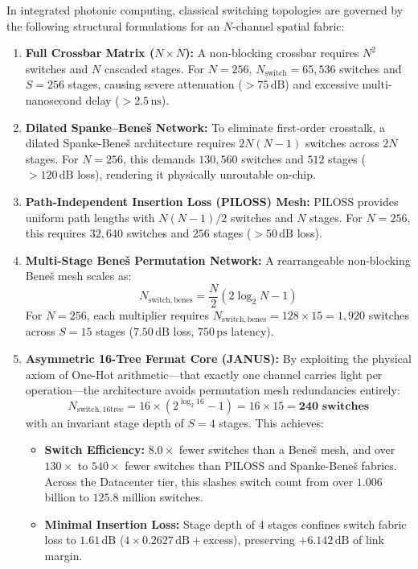 \documentclass[journal]{IEEEtran}
\begin{document}
In integrated photonic computing, classical switching topologies are governed by the following structural formulations for an $N$-channel spatial fabric:
\begin{enumerate}
\item \textbf{Full Crossbar Matrix ($N \times N$):} A non-blocking crossbar requires $N^2$ switches and $N$ cascaded stages. For $N=256$, $N_{\mathrm{switch}} = 65,536$ switches and $S = 256$ stages, causing severe attenuation ($>75\,\mathrm{dB}$) and excessive multi-nanosecond delay ($>2.5\,\mathrm{ns}$).
\item \textbf{Dilated Spanke--Bene\v{s} Network:} To eliminate first-order crosstalk, a dilated Spanke-Beneš architecture requires $2N(N-1)$ switches across $2N$ stages. For $N=256$, this demands $130,560$ switches and $512$ stages ($>120\,\mathrm{dB}$ loss), rendering it physically unroutable on-chip.
\item \textbf{Path-Independent Insertion Loss (PILOSS) Mesh:} PILOSS provides uniform path lengths with $N(N-1)/2$ switches and $N$ stages. For $N=256$, this requires $32,640$ switches and $256$ stages ($>50\,\mathrm{dB}$ loss).
\item \textbf{Multi-Stage Bene\v{s} Permutation Network:} A rearrangeable non-blocking Bene\v{s} mesh scales as:
\begin{equation}
N_{\mathrm{switch,benes}} = \frac{N}{2}(2\log_2 N - 1)
\end{equation}
For $N=256$, each multiplier requires $N_{\mathrm{switch,benes}} = 128 \times 15 = 1,920$ switches across $S=15$ stages ($7.50\,\mathrm{dB}$ loss, $750\,\mathrm{ps}$ latency).
\item \textbf{Asymmetric 16-Tree Fermat Core (JANUS):} By exploiting the physical axiom of One-Hot arithmetic---that exactly one channel carries light per operation---the architecture avoids permutation mesh redundancies entirely:
\begin{equation}
N_{\mathrm{switch,16tree}} = 16 \times (2^{\log_2 16} - 1) = 16 \times 15 = \mathbf{240\text{ switches}}
\end{equation}
with an invariant stage depth of $S = 4$ stages. This achieves:
\begin{itemize}
\item \textbf{Switch Efficiency:} $8.0\times$ fewer switches than a Bene\v{s} mesh, and over $130\times$ to $540\times$ fewer switches than PILOSS and Spanke-Beneš fabrics. Across the Datacenter tier, this slashes switch count from over $1.006$ billion to $125.8$ million switches.
\item \textbf{Minimal Insertion Loss:} Stage depth of 4 stages confines switch fabric loss to $1.61\,\mathrm{dB}$ ($4 \times 0.2627\,\mathrm{dB} + \text{excess}$), preserving $+6.142\,\mathrm{dB}$ of link margin.

\end{itemize}
\end{enumerate}
\end{document}
